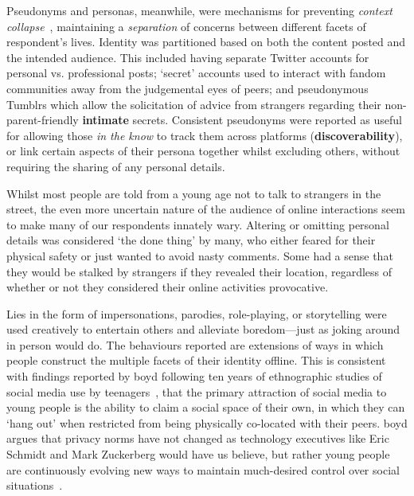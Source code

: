 \documentclass{sig-alternate}
\newcommand{\stag}[1]{\textbf{#1}}
\begin{document}
Pseudonyms and personas, meanwhile, were mechanisms for preventing \emph{context collapse}~\cite{hogan2010presentation,boyd2002faceted,Marwick2010}, maintaining a \emph{separation} of concerns between different facets of respondent's lives. 
Identity was partitioned based on both the content posted and the intended audience. This included having separate Twitter accounts for personal vs. professional posts; `secret' accounts used to interact with fandom communities away from the judgemental eyes of peers; and pseudonymous Tumblrs which allow the solicitation of advice from strangers regarding their non-parent-friendly \stag{intimate} secrets.  Consistent pseudonyms were reported as useful for allowing those \emph{in the know} to track them across platforms (\stag{discoverability}), or link certain aspects of their persona together whilst excluding others, without requiring the sharing of any personal details. 

Whilst most people are told from a young age not to talk to strangers in the street, the even more uncertain nature of the audience of online interactions seem to make many of our respondents innately wary. Altering or omitting personal details was considered `the done thing' by many, who either feared for their physical safety or just wanted to avoid nasty comments. Some had a sense that they would be stalked by strangers if they revealed their location, regardless of whether or not they considered their online activities provocative.

Lies in the form of impersonations, parodies, role-playing, or storytelling were used creatively to entertain others and alleviate boredom---just as joking around in person would do. The behaviours reported are extensions of ways in which people construct the multiple facets of their identity offline.  This is consistent with findings reported by boyd following ten years of ethnographic studies of social media use by teenagers~\cite{boyd2014}, that the primary attraction of social media to young people is the ability to claim a social space of their own, in which they can `hang out' when restricted from being physically co-located with their peers. boyd argues that privacy norms have not changed as technology executives like Eric Schmidt and Mark Zuckerberg would have us believe, but rather young people are continuously evolving new ways to maintain much-desired control over social situations~\cite{boyd2014, guardian}.
\end{document}
